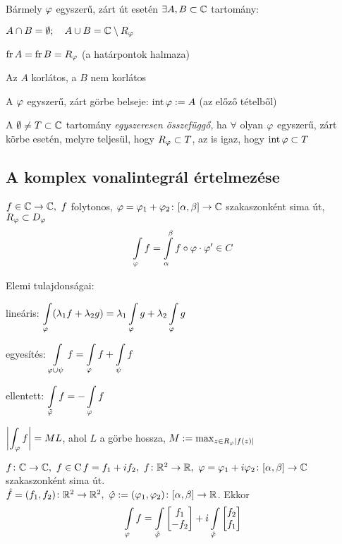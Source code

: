 \begin{te}[Jordan] Bármely $\varphi$ egyszerű, zárt út esetén $\exists A,B\subset\mathbb{C}$ tartomány:
  \begin{enumzjr}
    \item $A\cap B=\emptyset; \quad A\cup B=\mathbb{C}\setminus R_\varphi$
    \item $\operatorname{fr} A = \operatorname{fr} B = R_\varphi$ (a határpontok halmaza)
    \item Az $A$ korlátos, a $B$ nem korlátos
  \end{enumzjr}
\end{te}

\begin{de}A $\varphi$ egyszerű, zárt görbe belseje: $\operatorname{int} \varphi := A$ (az előző tételből)
\end{de}
\begin{de}
  A $\emptyset \neq T\subset \mathbb{C}$ tartomány \emph{egyszeresen összefüggő}, ha $\forall$ olyan $\varphi$ egyszerű, zárt körbe
  esetén, melyre teljesül, hogy $R_\varphi\subset T$, az is igaz, hogy $\operatorname{int} \varphi \subset T$
\end{de}

\subsection{A komplex vonalintegrál értelmezése}
\begin{de} $f\in\mathbb{C}\to\mathbb{C},\ f$ folytonos, $\varphi=\varphi_1+\varphi_2\colon [\alpha,\beta]\to \mathbb{C}$ szakaszonként sima út,
  $R_\varphi\subset D_\varphi$
\[ \di \Int_\vfi f = \Int _\alpha^\beta f\circ \vfi \cdot \vfi' \in C\]
\end{de}

\noindent Elemi tulajdonságai:\\
\begin{enumzjb}
  \item lineáris: $\di\Int_\vfi (\lambda_1 f + \lambda_2 g) = \lambda_1 \Int_\vfi g + \lambda_2 \Int_\vfi g$
  \item egyesítés: $\di\Int_{\vfi \cup \psi }f = \Int_\vfi f+ \Int_\psi f$
  \item ellentett: $\di\Int_{\Tilde{\vfi}} f = - \Int_\vfi f$
  \item $ \displaystyle\left\vert \int_\varphi f\right\vert = ML$, ahol $L$ a görbe hossza, $M := \max_{z\in R_\varphi |f(z)|}$
\end{enumzjb}
\begin{te}
  $f\colon \mathbb{C}\to\mathbb{C},\ f\in\operatorname{C}\\f=f_1 + if_2,\ f\colon \mathbb{R}^2\to\mathbb{R},\ \varphi=\varphi_1 +i\varphi_2\colon [\alpha,\beta]\to\mathbb{C}$
  szakaszonként sima út.\\
  $\hat f = (f_1,f_2)\colon \R^2\to\R^2,\ \hat\vfi := (\vfi_1,\vfi_2)\colon[\alpha,\beta]\to\R$. Ekkor 
  \[\di\Int_\vfi f = \Int_{\hat\vfi}\begin{bmatrix}f_1\\-f_2 \end{bmatrix} + i\Int_{\hat\vfi}\begin{bmatrix}f_2\\f_1
  \end{bmatrix}\]
\end{te}

